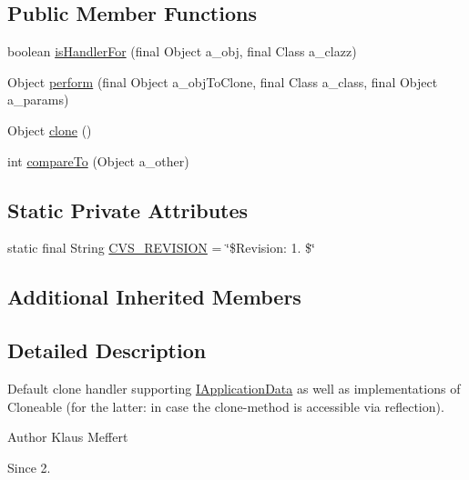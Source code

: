 \subsection*{Public Member Functions}
\begin{DoxyCompactItemize}
\item 
boolean \hyperlink{classorg_1_1jgap_1_1impl_1_1_default_clone_handler_a10509512ab17167465284441863c6d18}{is\-Handler\-For} (final Object a\-\_\-obj, final Class a\-\_\-clazz)
\item 
Object \hyperlink{classorg_1_1jgap_1_1impl_1_1_default_clone_handler_a7e81a10fa8f33762e62f9484fb1da285}{perform} (final Object a\-\_\-obj\-To\-Clone, final Class a\-\_\-class, final Object a\-\_\-params)
\item 
Object \hyperlink{classorg_1_1jgap_1_1impl_1_1_default_clone_handler_a4e707a3046b850327060b0fa6cf0efb4}{clone} ()
\item 
int \hyperlink{classorg_1_1jgap_1_1impl_1_1_default_clone_handler_a85eeb61727c942218505d48e696ad983}{compare\-To} (Object a\-\_\-other)
\end{DoxyCompactItemize}
\subsection*{Static Private Attributes}
\begin{DoxyCompactItemize}
\item 
static final String \hyperlink{classorg_1_1jgap_1_1impl_1_1_default_clone_handler_ad2c84d3ba1cdd65ab5f18391a676745f}{C\-V\-S\-\_\-\-R\-E\-V\-I\-S\-I\-O\-N} = \char`\"{}\$Revision\-: 1. \$\char`\"{}
\end{DoxyCompactItemize}
\subsection*{Additional Inherited Members}


\subsection{Detailed Description}
Default clone handler supporting \hyperlink{interfaceorg_1_1jgap_1_1_i_application_data}{I\-Application\-Data} as well as implementations of Cloneable (for the latter\-: in case the clone-\/method is accessible via reflection).

\begin{DoxyAuthor}{Author}
Klaus Meffert 
\end{DoxyAuthor}
\begin{DoxySince}{Since}
2. 
\end{DoxySince}


